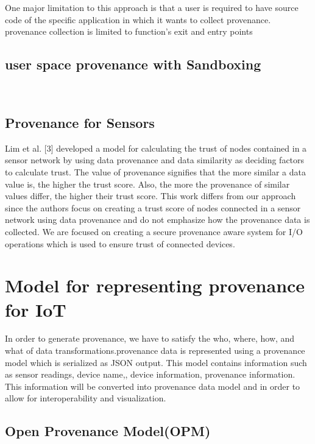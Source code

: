 One major limitation to this approach is that a user is required to have source code of the specific application in which it wants to collect provenance. provenance collection is limited to function's exit and entry points









\subsection{user space provenance with Sandboxing}
\

\subsection{Provenance for Sensors}
Lim et al. [3] developed a
model for calculating the trust of nodes contained in a sensor network by using data
provenance and data similarity as deciding factors to calculate trust. The value of
provenance signifies that the more similar a data value is, the higher the trust score.
Also, the more the provenance of similar values differ, the higher their trust score.
This work differs from our approach since the authors focus on creating a trust score
of nodes connected in a sensor network using data provenance and do not emphasize
how the provenance data is collected. We are focused on creating a secure
provenance aware system for I/O operations which is used to ensure trust of
connected devices.




\section{Model for representing provenance for IoT}

In order to generate provenance, we have to satisfy the who, where, how, and what of data transformations.provenance data is represented using a provenance model which is serialized as JSON output. This model contains information such as sensor readings, device name,, device information, provenance information. This information will be converted into provenance data model and in order to allow for interoperability and visualization.

\subsection{Open Provenance Model(OPM)}

